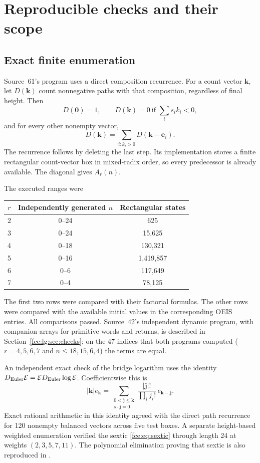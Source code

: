 \documentclass[11pt,a4paper]{article}
\numberwithin{equation}{section}
\theoremstyle{definition}\newtheorem{definition}[theorem]{Definition}
\theoremstyle{remark}\newtheorem{remark}[theorem]{Remark}
\newcommand{\E}{\mathcal E}
\begin{document}
\section{Reproducible checks and their scope}\label{fce:sec:checks}
\subsection{Exact finite enumeration}
Source~61's program  uses a direct composition
recurrence. For a count vector $\boldsymbol k$, let $D(\boldsymbol k)$
count nonnegative paths with that composition, regardless of final height.
Then
\[
 D(\boldsymbol0)=1,\qquad
 D(\boldsymbol k)=0\ \text{if }\sum_i s_i k_i<0,
\]
and for every other nonempty vector,
\[
 D(\boldsymbol k)=\sum_{i:k_i>0}D(\boldsymbol k-\boldsymbol e_i).
\]
The recurrence follows by deleting the last step. Its implementation stores
a finite rectangular count-vector box in mixed-radix order, so every
predecessor is already available. The diagonal gives $A_r(n)$.

The executed ranges were
\begin{center}
\begin{tabular}{ccc}
\toprule
$r$&Independently generated $n$&Rectangular states\\
\midrule
2&0--24&625\\
3&0--24&15,625\\
4&0--18&130,321\\
5&0--16&1,419,857\\
6&0--6&117,649\\
7&0--4&78,125\\
\bottomrule
\end{tabular}
\end{center}
The first two rows were compared with their factorial formulas. The other
rows were compared with the available initial values in the corresponding
OEIS entries. All comparisons passed. Source~42's independent dynamic
program, with companion arrays for primitive words and returns, is
described in Section~\ref{fce:lg:sec:checks}; on the 47 indices that both
programs computed ($r=4,5,6,7$ and $n\le18,15,6,4$) the terms are
equal.

An independent exact check of the bridge logarithm uses the identity
$D_{\rm Euler}\E=\E D_{\rm Euler}\log\E$. Coefficientwise this is
\begin{equation}\label{fce:eq:expcheck}
 |\boldsymbol k|e_{\boldsymbol k}
 =\sum_{\substack{0<\boldsymbol j\le\boldsymbol k\\s\cdot\boldsymbol j=0}}
 \frac{|\boldsymbol j|!}{\prod_i j_i!}\,
 e_{\boldsymbol k-\boldsymbol j}.
\end{equation}
Exact rational arithmetic in this identity agreed with the direct path
recurrence for 120 nonempty balanced vectors across five test boxes.
A separate height-based weighted enumeration verified the sextic
\eqref{fce:eq:sextic} through length 24 at weights $(2,3,5,7,11)$.
The polynomial elimination proving that sextic is also reproduced in
.
\end{document}
